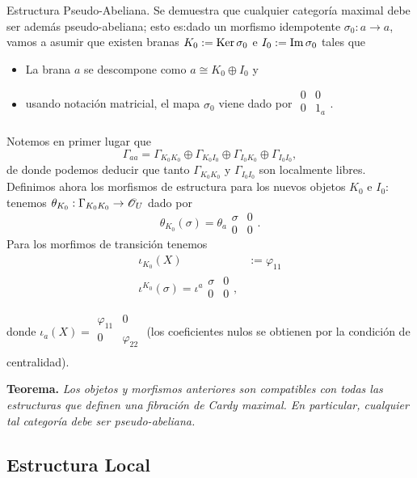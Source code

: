 {{\sc Estructura Pseudo-Abeliana.} Se demuestra que cualquier categor\'ia maximal debe ser adem\'as pseudo-abeliana; esto es:dado un morfismo idempotente $\sigma_0 :a\to a$, vamos a asumir que existen branas $K_0:=\operatorname{Ker}\sigma_0$ e $I_0:=\operatorname{Im}\sigma_0$ tales que
\begin{itemize}
\item La brana $a$ se descompone como $a\cong K_0\oplus I_0$ y
\item usando notaci\'on matricial, el mapa $\sigma_0$ viene dado por $\begin{smallmatrix} 0 & 0 \\ 0 & 1_a \\ \end{smallmatrix}$.
\end{itemize}
Notemos en primer lugar que
$$\Gamma_{aa}=\Gamma_{K_0K_0}\oplus \Gamma_{K_0I_0}\oplus \Gamma_{I_0K_0}\oplus \Gamma_{I_0I_0},$$
de donde podemos deducir que tanto $\Gamma_{K_0K_0}$ y $\Gamma_{I_0I_0}$ son localmente libres.
Definimos ahora los morfismos de estructura para los nuevos objetos $K_0$ e $I_0$: tenemos $\theta_{K_0}:\Gamma_{K_0K_0}\to \mathscr{O}_U$ dado por
$$\theta_{K_0}(\sigma )=\theta_a\begin{smallmatrix} \sigma & 0 \\ 0 & 0\end{smallmatrix}.$$
Para los morfimos de transici\'on tenemos
$$
\begin{aligned}
\iota_{K_0}(X) &:= \varphi_{11} \\
\iota^{K_0}(\sigma )=\iota^a\begin{smallmatrix} \sigma & 0 \\ 0 & 0 \\ \end{smallmatrix}, \\
\end{aligned}
$$
donde $\iota_a(X)=\begin{smallmatrix} \varphi_{11} & 0 \\ 0 & \varphi_{22} \\ \end{smallmatrix}$ (los coeficientes nulos se obtienen por la condici\'on de centralidad).
\medskip

{\bf Teorema.} {\it Los objetos y morfismos anteriores son compatibles con todas las estructuras que definen una fibraci\'on de Cardy maximal. En particular, cualquier tal categor\'ia debe ser pseudo-abeliana.}


\subsection{Estructura Local}

}
